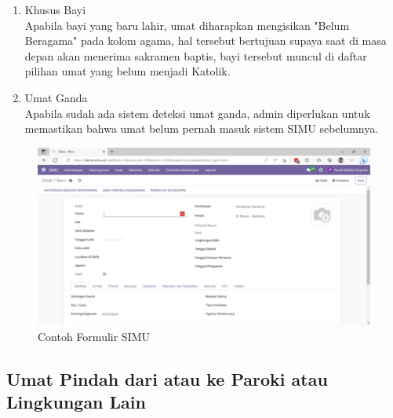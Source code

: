 \begin{enumerate}
	\item Khusus Bayi \\
	Apabila bayi yang baru lahir, umat diharapkan mengisikan "Belum Beragama" pada kolom agama, hal tersebut bertujuan supaya saat di masa depan akan menerima sakramen baptis, bayi tersebut muncul di daftar pilihan umat yang belum menjadi Katolik.
	\item Umat Ganda \\
	Apabila sudah ada sistem deteksi umat ganda, admin diperlukan untuk memastikan bahwa umat belum pernah masuk sistem SIMU sebelumnya.
\end{enumerate}

\begin{figure}[H]
	\centering
	\includegraphics[scale=1]{Gambar/formSimu.png}
	\caption{Contoh Formulir SIMU} 
	\label{fig:formSimu}
\end{figure}

\subsection{Umat Pindah dari atau ke Paroki atau Lingkungan Lain}
\label{sec:umatPindah}

